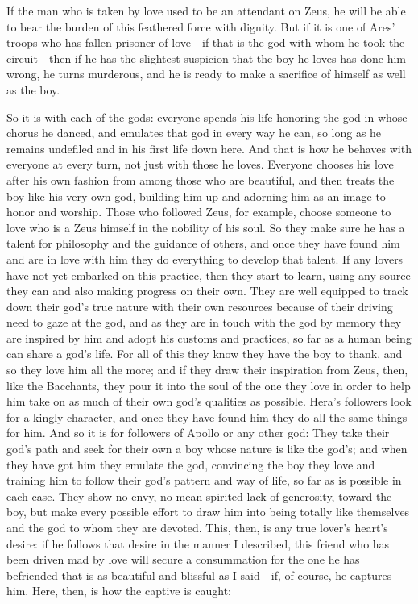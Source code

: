 If the man who is taken by love used to be an attendant on Zeus, he
will be able to bear the burden of this feathered force with dignity.
But if it is one of Ares’ troops who has fallen prisoner of love---if
that is the god with whom he took the circuit---then if he has the
slightest suspicion that the boy he loves has done him wrong, he turns
murderous, and he is ready to make a sacrifice of himself as well as the
boy.

So it is with each of the gods: everyone spends his life
honoring the god in whose chorus he danced, and emulates that god in
every way he can, so long as he remains undefiled and in his first life
down here. And that is how he behaves with everyone at every turn, not
just with those he loves. Everyone chooses his love after his own
fashion from among those who are beautiful, and then treats the
boy like his very own god, building him up and adorning him as an image
to honor and worship. Those who followed Zeus, for example, choose
someone to love who is a Zeus himself in the nobility of his soul. So
they make sure he has a talent for philosophy and the guidance of
others, and once they have found him and are in love with him they do
everything to develop that talent. If any lovers have not yet embarked
on this practice, then they start to learn, using any source they can
and also making progress on their own. They are well equipped to track
down their god’s true nature with their own resources
because of their driving need to gaze at the god, and as they are in
touch with the god by memory they are inspired by him and adopt his
customs and practices, so far as a human being can share a god’s life.
For all of this they know they have the boy to thank, and so they love
him all the more; and if they draw their inspiration from Zeus, then,
like the Bacchants,
they pour it into the soul of the one they love in order to help
him take on as much of their own god’s qualities as possible. Hera’s
followers look for a kingly character, and once they have found him they
do all the same things for him. And so it is for followers of Apollo or
any other god: They take their god’s path and seek for their own a boy
whose nature is like the god’s; and when they have got him they emulate
the god, convincing the boy they love and training him to follow their
god’s pattern and way of life, so far as is possible in each case. They
show no envy, no mean-spirited lack of generosity, toward the boy, but
make every possible effort to draw him into being totally like
themselves and the god to whom they are devoted. This, then, is any true
lover’s heart’s desire: if he follows that desire in the manner I
described, this friend who has been driven mad by love will secure a
consummation for the
one he has befriended that is as beautiful and blissful as I said---if,
of course, he captures him. Here, then, is how the captive is caught:

